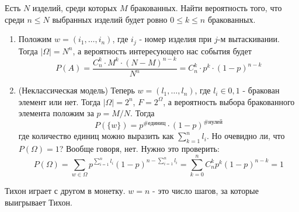 \begin{itemize}
\begin{enumerate}
		\begin{example}
			Есть $N$ изделий, среди которых $M$ бракованных. Найти вероятность того, что среди $n \le N$ выбранных изделий будет ровно $0 \le k \le n$ бракованных.
		
			\begin{enumerate}
				\item Положим $w = (i_1, \ldots, i_n)$, где $i_j$ - номер изделия при $j$-м вытаскивании. Тогда $|\Omega| = N^n$, а вероятность интересующего нас события будет
				\[
					P(A) = \frac{C_n^k \cdot M^k \cdot (N - M)^{n - k}}{N^n} = C_n^k \cdot p^k \cdot (1 - p)^{n - k}
				\]
				
				\item (Неклассическая модель) Теперь $w = (l_1, \ldots, l_n)$, где $l_i \in {0, 1}$ - бракован элемент или нет. Тогда $|\Omega| = 2^n$, $F = 2^\Omega$, а вероятность выбора бракованного элемента положим за $p = M / N$. Тогда
				\[
					P(\{w\}) = p^{\text{\#единиц}} \cdot (1 - p)^{\text{\#нулей}}
				\]
				где количество единиц можно выразить как $\sum_{k = 1}^n l_i$. Но очевидно ли, что $P(\Omega) = 1$? Вообще говоря, нет. Нужно это проверить:
				\[
					P(\Omega) = \sum_{w \in \Omega} p^{\sum_{i = 1}^n l_i} (1 - p)^{n - \sum_{i = 1}^n l_i} = \sum_{k = 0}^n C_n^k p^k (1 - p)^{n - k} = 1
				\]
			\end{enumerate}
		\end{example}
	
		\begin{example}
			Тихон играет с другом в монетку. $w = n$ - это число шагов, за которые выигрывает Тихон.
		\end{example}
	\end{enumerate}
\end{itemize}